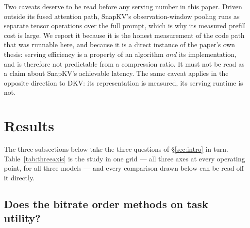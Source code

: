 \documentclass[sigplan,10pt,anonymous,review,nonacm]{acmart}
\newcommand{\Sres}{\mathcal{S}_{\text{res}}}
\newcommand{\Ssys}{\mathcal{S}_{\text{sys}}}
\newcommand{\beff}{b_{\text{eff}}}
\begin{document}
Two caveats deserve to be read before any serving number in this paper.
Driven outside its fused attention path, SnapKV's observation-window pooling
runs as separate tensor operations over the full prompt, which is why its
measured prefill cost is large. We report it because it is the honest
measurement of the code path that was runnable here, and because it is a
direct instance of the paper's own thesis: serving efficiency is a property of
an algorithm \emph{and} its implementation, and is therefore not predictable
from a compression ratio. It must not be read as a claim about SnapKV's
achievable latency. The same caveat applies in the opposite direction to DKV:
its representation is measured, its serving runtime is not.

\section{Results}
\label{sec:results}

The three subsections below take the three questions of \S\ref{sec:intro} in
turn. Table~\ref{tab:threeaxis} is the study in one grid --- all three axes at
every operating point, for all three models --- and every comparison drawn
below can be read off it directly.

\begin{table}[t]
\centering
\small
\setlength{\tabcolsep}{4.2pt}
\caption{\textbf{Reading across a row shows the three axes disagreeing.}
$b_{\text{pay}}$ is the compressed payload alone --- the quantity
conventionally reported --- and $\beff$ additionally charges mandatory
metadata (Eq.~\ref{eq:beff}); ``meta'' is the metadata share of realised
footprint. ``$\times$dense'' is the mean per-query TTFT ratio against that
query's own dense execution. $\phi$ (Eq.~\ref{eq:phi}) is the pure hardware
term and carries the serving evidence; $\Ssys$ is the convenience summary of
\S\ref{sec:parts} and is not used as evidence anywhere. Best $\Sres$ and best
$\phi$ per model in \textbf{bold} ($\phi$ excluding the dense reference, which
is $1.00$ by definition). Serving figures reflect the implementations in
Table~\ref{tab:provenance}. Paired coverage was $1.00$ throughout.}
\label{tab:threeaxis}

\end{table}

\subsection{Does the bitrate order methods on task utility?}
\label{sec:res_task}
\end{document}
